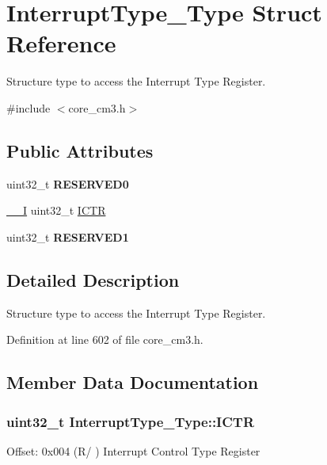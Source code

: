 \hypertarget{struct_interrupt_type___type}{\section{\-Interrupt\-Type\-\_\-\-Type \-Struct \-Reference}
\label{struct_interrupt_type___type}
}


\-Structure type to access the \-Interrupt \-Type \-Register.  




{\ttfamily \#include $<$core\-\_\-cm3.\-h$>$}

\subsection*{\-Public \-Attributes}
\begin{DoxyCompactItemize}
\item 
\hypertarget{struct_interrupt_type___type_ae0d588643b0488fce4c0a90b85edf362}{uint32\-\_\-t {\bfseries \-R\-E\-S\-E\-R\-V\-E\-D0}}\label{struct_interrupt_type___type_ae0d588643b0488fce4c0a90b85edf362}

\item 
\hyperlink{group___c_m_s_i_s__core__definitions_gaf63697ed9952cc71e1225efe205f6cd3}{\-\_\-\-\_\-\-I} uint32\-\_\-t \hyperlink{struct_interrupt_type___type_a2b10f6d37363a6b798ac97f4c4db1e63}{\-I\-C\-T\-R}
\item 
\hypertarget{struct_interrupt_type___type_a45933eb981309d50f943ec3af67f17be}{uint32\-\_\-t {\bfseries \-R\-E\-S\-E\-R\-V\-E\-D1}}\label{struct_interrupt_type___type_a45933eb981309d50f943ec3af67f17be}

\end{DoxyCompactItemize}


\subsection{\-Detailed \-Description}
\-Structure type to access the \-Interrupt \-Type \-Register. 

\-Definition at line 602 of file core\-\_\-cm3.\-h.



\subsection{\-Member \-Data \-Documentation}
\hypertarget{struct_interrupt_type___type_a2b10f6d37363a6b798ac97f4c4db1e63}{
\subsubsection[{\-I\-C\-T\-R}]{ uint32\-\_\-t {\bf \-Interrupt\-Type\-\_\-\-Type\-::\-I\-C\-T\-R}}}\label{struct_interrupt_type___type_a2b10f6d37363a6b798ac97f4c4db1e63}
\-Offset\-: 0x004 (\-R/ ) \-Interrupt \-Control \-Type \-Register 

